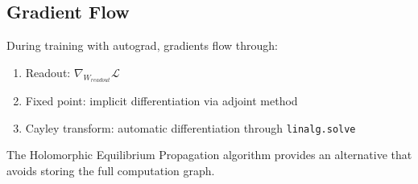 \documentclass[11pt,a4paper]{article}
\newcommand{\LL}{\mathcal{L}}
\begin{document}
\subsection{Gradient Flow}

During training with autograd, gradients flow through:
\begin{enumerate}
    \item Readout: $\nabla_{W_{readout}}\LL$
    \item Fixed point: implicit differentiation via adjoint method
    \item Cayley transform: automatic differentiation through \texttt{linalg.solve}
\end{enumerate}

The Holomorphic Equilibrium Propagation algorithm provides an alternative that avoids storing the full computation graph.
\end{document}
